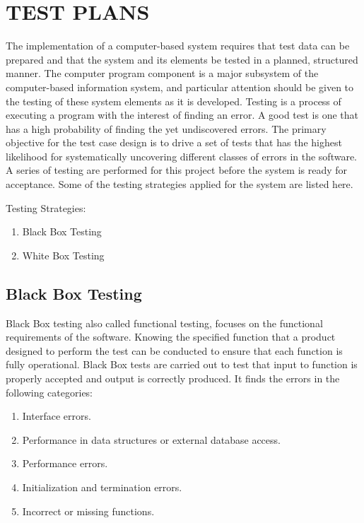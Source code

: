 \documentclass[11pt]{report} %
\begin{document}
\section{TEST PLANS}
\label{sec:TEST PLANS}

The implementation of a computer-based system requires that test data can be prepared and that the system and its elements be tested in a planned, structured manner. The computer program component is a major subsystem of the computer-based information system, and particular attention should be given to the testing of these system elements as it is developed.
Testing is a process of executing a program with the interest of finding an error. A good test is one that has a high probability of finding the yet undiscovered errors. The primary objective for the test case design is to drive a set of tests that has the highest likelihood for systematically uncovering different classes of errors in the software. A series of testing are performed for this project before the system is ready for acceptance.  Some of the testing strategies applied for the system are listed here.

Testing Strategies: 
\begin{enumerate}
	\item Black Box Testing
	\item White Box Testing
\end{enumerate}

\subsection{Black Box Testing}
\label{subsec:Black Box Testing}

Black Box testing also called functional testing, focuses on the functional requirements of the software. Knowing the specified function that a product designed to perform the test can be conducted to ensure that each function is fully operational. Black Box tests are carried out to test that input to function is properly accepted and output is correctly produced. It finds the errors in the following categories:

\begin{enumerate}
	\item Interface errors.
	\item Performance in data structures or external database access.
	\item Performance errors.
	\item Initialization and termination errors.
	\item Incorrect or missing functions.
\end{enumerate}
\end{document}
